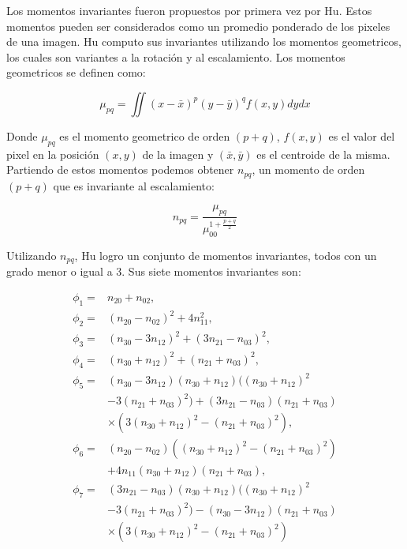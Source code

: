 \documentclass[a4paper, 11pt, oneside]{report}
\begin{document}
Los momentos invariantes fueron propuestos por primera vez por Hu\cite{Hu62}. Estos momentos pueden ser considerados como un promedio ponderado de los pixeles de una imagen. Hu computo sus invariantes utilizando los momentos geometricos, los cuales son variantes a la rotación y al escalamiento. Los momentos geometricos se definen como:

	\begin{equation}\label{eq1}
		\mu_{pq} = \iint{ {(x-\bar{x})^p} {(y-\bar{y})^q} f(x,y) dy dx }
	\end{equation}

Donde $\mu_{pq}$ es el momento geometrico de orden $(p+q)$, $f(x,y)$ es el valor del pixel en la posición $(x,y)$ de la imagen y $(\bar{x},\bar{y})$ es el centroide de la misma. Partiendo de estos momentos podemos obtener $n_{pq}$, un momento de orden $(p+q)$ que es invariante al escalamiento:

	\begin{equation}\label{eq2}
		n_{pq} = \frac{\mu_{pq}}{ \mu_{00}^{1+\frac{p+q}{2}} }
	\end{equation}

Utilizando $n_{pq}$, Hu logro un conjunto de momentos invariantes, todos con un grado menor o igual a 3. Sus siete momentos invariantes son:

	\begin{align*}
		\phi_1 =& n_{20} + n_{02},\\
		\phi_2 =& (n_{20} - n_{02})^{2} + 4n_{11}^{2},\\
		\phi_3 =& (n_{30} - 3n_{12})^{2} + (3n_{21} - n_{03})^{2},\\
		\phi_4 =& (n_{30} + n_{12})^{2} + (n_{21} + n_{03})^{2},\\
		\phi_5 =& (n_{30} - 3n_{12})(n_{30} + n_{12})((n_{30} + n_{12})^{2}\\
				& - 3(n_{21} + n_{03})^{2}) + (3n_{21} - n_{03})(n_{21} + n_{03})\\
				& \times (3(n_{30} + n_{12})^{2} - (n_{21} + n_{03})^{2}),\\
		\phi_6 =& (n_{20} - n_{02})((n_{30} + n_{12})^{2} - (n_{21} + n_{03})^{2})\\
				& + 4n_{11}(n_{30} + n_{12})(n_{21} + n_{03}),\\
		\phi_7 =& (3n_{21} - n_{03})(n_{30} + n_{12})((n_{30} + n_{12})^{2}\\
				& - 3(n_{21} + n_{03})^{2}) - (n_{30} - 3n_{12})(n_{21} + n_{03})\\
				& \times (3(n_{30} + n_{12})^{2} - (n_{21} + n_{03})^{2})\\
	\end{align*}
\end{document}
